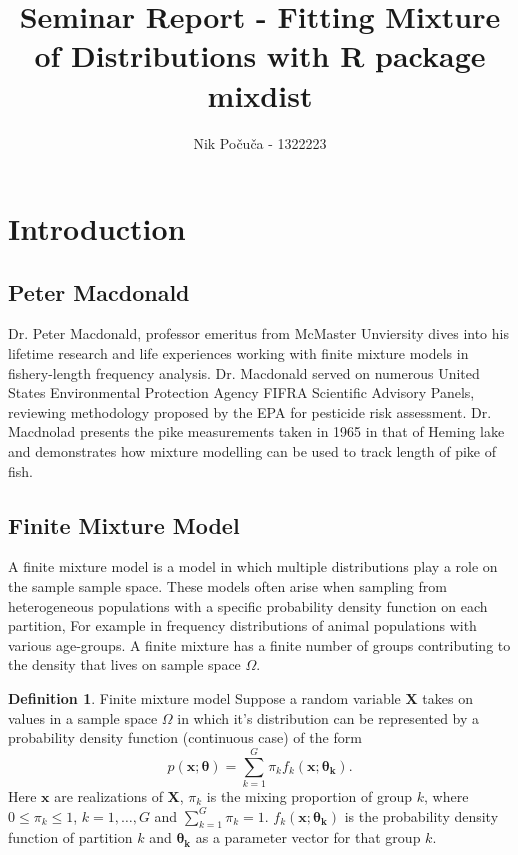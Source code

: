 \documentclass[12pt,letterpaper]{report}
\theoremstyle{definition}
\newtheorem{definition}{Definition}[section]
\begin{document}
\author{Nik Po\v cu\v ca -  1322223}
\title{Seminar Report - Fitting Mixture of Distributions with R package mixdist}
\maketitle
\section{Introduction}
\subsection{Peter Macdonald}
Dr. Peter Macdonald, professor emeritus from McMaster Unviersity dives into his lifetime research and life experiences working with finite mixture models in fishery-length frequency analysis. Dr. Macdonald served on numerous United States Environmental Protection Agency FIFRA Scientific Advisory Panels, reviewing methodology proposed by the EPA for pesticide risk assessment. Dr. Macdnolad presents the pike measurements taken in 1965 in that of Heming lake and demonstrates how mixture modelling can be used to track length of pike of fish. 
\subsection{Finite Mixture Model}
A finite mixture model is a model in which multiple distributions play a role on the sample sample space. These models often arise when sampling from heterogeneous populations with a specific probability density function on each partition, For example in frequency distributions of animal populations with various age-groups. A finite mixture has a finite number of groups contributing to the density that lives on sample space $\Omega$. 

\begin{definition}{Finite mixture model}
Suppose a random variable $\bm{X}$ takes on values in a sample space $\Omega$ in which it's distribution can be represented by a probability density function (continuous case) of the form 
$$p(\bm{x} ; \bm{\theta}) = \sum_{k=1}^G \pi_k f_k(\bm{x}; \bm{\theta_k}).$$
Here $\bm{x}$ are realizations of $\bm X$, $\pi_k$ is the mixing proportion of group $k$, where $0 \leq \pi_k \leq 1$, $k= 1, \dots, G$ and $\sum_{k=1}^G \pi_k = 1$.  $f_k(\bm{x}; \bm{\theta_k})$ is the probability density function of partition $k$ and $\bm{\theta_k}$ as a parameter vector for that group $k$. 
\end{definition}
\end{document}

